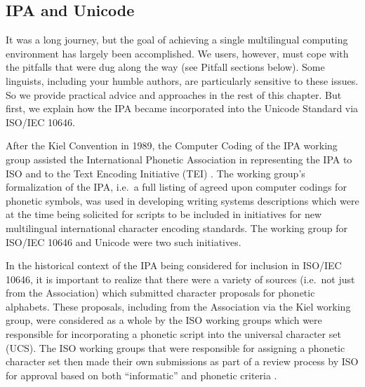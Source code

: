 \subsection{IPA and Unicode}

It was a long journey, but the goal of achieving a single multilingual 
computing environment has largely been accomplished. We users, however, 
must cope with the pitfalls that were dug along the way (see Pitfall sections below). 
Some linguists, including your humble authors, are particularly sensitive 
to these issues. So we provide practical advice and approaches in the rest 
of this chapter. But first, we explain how the IPA became incorporated 
into the Unicode Standard via ISO/IEC 10646.


After the Kiel Convention in 1989, the Computer Coding of the IPA working 
group assisted the International Phonetic Association in representing the 
IPA to ISO and to the Text Encoding Initiative (TEI) \citep{EslingGaylord1993}. 
The working group's formalization of the IPA, i.e.\ a full listing of agreed 
upon computer codings for phonetic symbols, was used in developing writing 
systems descriptions which were at the time being solicited for scripts to 
be included in initiatives for new multilingual international character 
encoding standards. The working group for ISO/IEC 10646 and Unicode were 
two such initiatives.

In the historical context of the IPA being considered for inclusion in 
ISO/IEC 10646, it is important to realize that there were a variety of 
sources (i.e.\ not just from the Association) which submitted character 
proposals for phonetic alphabets. These proposals, including from the 
Association via the Kiel working group, were considered as a whole by 
the ISO working groups which were responsible for incorporating a phonetic 
script into the universal character set (UCS). The ISO working groups that 
were responsible for assigning a phonetic character set then made their 
own submissions as part of a review process by ISO for approval based on 
both ``informatic'' and phonetic criteria \citep[86]{EslingGaylord1993}. 

